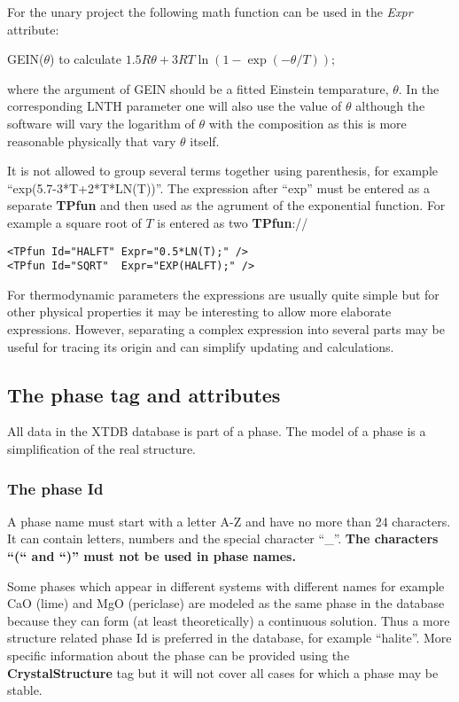 \documentclass{article}
\begin{document}
For the unary project the following math function can be used in the
{\em Expr} attribute:

GEIN($\theta$) to calculate $1.5R\theta+3RT\ln(1-\exp(-\theta/T));$

\noindent
where the argument of GEIN should be a fitted Einstein temparature,
$\theta$.  In the corresponding LNTH parameter one will also use the
value of $\theta$ although the software will vary the logarithm of
$\theta$ with the composition as this is more reasonable physically
that vary $\theta$ itself.

It is not allowed to group several terms together using parenthesis,
for example ``exp(5.7-3*T+2*T*LN(T))''.  The expression after ``exp''
must be entered as a separate {\bf TPfun} and then used as the
agrument of the exponential function.  For example a square root of
$T$ is entered as two {\bf TPfun}://
\begin{verbatim}
<TPfun Id="HALFT" Expr="0.5*LN(T);" />
<TPfun Id="SQRT"  Expr="EXP(HALFT);" />
\end{verbatim}

For thermodynamic parameters the expressions are usually quite simple
but for other physical properties it may be interesting to allow more
elaborate expressions.  However, separating a complex expression into
several parts may be useful for tracing its origin and can simplify
updating and calculations.
  
\subsection{The phase tag and attributes}\label{sec:phasetag}

All data in the XTDB database is part of a phase.  The model of a
phase is a simplification of the real structure.

\subsubsection{The phase Id}\label{sec:phaseid}

A phase name must start with a letter A-Z and have no more than 24
characters.  It can contain letters, numbers and the special character
``\_''.  {\bf The characters ``(`` and ``)'' must not be used in phase
  names.}   

Some phases which appear in different systems with different names for
example CaO (lime) and MgO (periclase) are modeled as the same phase
in the database because they can form (at least theoretically) a
continuous solution.  Thus a more structure related phase {\rm Id} is
preferred in the database, for example ``halite''.  More specific
information about the phase can be provided using the {\bf
  CrystalStructure} tag but it will not cover all cases for which a
phase may be stable.
\end{document}
